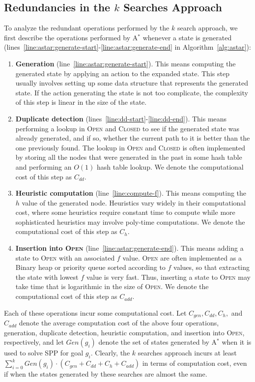 \documentclass{aicom2e}
\newcommand{\astar}{A$^*$}
\newcommand{\open}{\textsc{Open}}
\newcommand{\closed}{\textsc{Closed}}
\begin{document}
\subsection{Redundancies in the $k$ Searches Approach}

To analyze the redundant operations performed by the $k$ search approach, we first describe the operations performed by \astar{} whenever a state is generated (lines~\ref{line:astar:generate-start}-\ref{line:astar:generate-end} in Algorithm~\ref{alg:astar}):
\begin{enumerate}
\item {\bf Generation}  (line~\ref{line:astar:generate-start}). This means computing the generated state by applying 
an action to the expanded state. This step usually involves setting up some data structure that represents the generated state. If the action generating the state is not too complicate, the complexity of this step is linear in the size of the state. 
\item {\bf Duplicate detection}  (lines~\ref{line:dd-start}-\ref{line:dd-end}). This means performing a lookup in \open{} and \closed{} to see if the generated state was already generated, and if so, whether the current path to it is better than the one previously found. The lookup in \open{} and \closed{} is often implemented by storing all the nodes that were generated in the past in some hash table and performing an $O(1)$ hash table lookup. We denote the computational cost of this step as $C_{dd}$. 
\item {\bf Heuristic computation}  (line~\ref{line:compute-f}). This means computing the $h$ value of the generated node. Heuristics vary widely in their computational cost, where some heuristics require constant time to compute while more sophisticated heuristics may involve poly-time computations. We denote the computational cost of this step as $C_{h}$. 
\item {\bf Insertion into \open{}}  (line~\ref{line:astar:generate-end}). This means adding a state to \open{} with an associated $f$ value. \open{} are often implemented as a Binary heap or priority queue sorted according to $f$ values, so that extracting the state with lowest $f$ value is very fast. Thus, inserting a state to \open{} may take time that is logarithmic in the size of \open{}. We denote the computational cost of this step as $C_{add}$.  
\end{enumerate}
Each of these operations incur some computational cost. Let $C_{gen}, C_{dd}, C_{h},$ and $C_{add}$ denote the average computation cost 
of the above four operations, generation, duplicate detection, heuristic computation, and insertion into \open{}, respectively, 
and let $Gen(g_i)$ denote the set of states generated by \astar{} when it is used to solve SPP for goal $g_i$.  
Clearly, the $k$ searches approach incurs at least $\sum_{i=0}^k Gen(g_i)\cdot(C_{gen}+C_{dd}+C_{h}+C_{add})$ in terms of computation cost, 
even if when the states generated by these searches are almost the same. 
\end{document}
